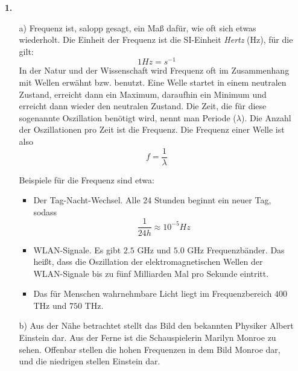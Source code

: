 \documentclass [a4paper,11pt]{article}
\author{\authorinfotitle}
\title{\titleinfo}
\date{\today}
\begin{document}
\maketitle
    \begin{enumerate}
        \item[\textbf{1.}]
            \begin{enumerate}
                \item[a)]
                Frequenz ist, salopp gesagt, ein Maß dafür, wie oft sich etwas wiederholt.
                Die Einheit der Frequenz ist die SI-Einheit \textit{Hertz} (Hz), für die gilt:
                $$1 Hz = s^{-1}$$
                In der Natur und der Wissenschaft wird Frequenz oft im Zusammenhang mit Wellen
                erwähnt bzw. benutzt. Eine Welle startet in einem neutralen Zustand,
                erreicht dann ein Maximum, daraufhin ein Minimum und erreicht dann wieder den
                neutralen Zustand. Die Zeit, die für diese sogenannte Oszillation benötigt wird,
                nennt man Periode ($\lambda$). Die Anzahl der Oszillationen pro Zeit ist die Frequenz.
                Die Frequenz einer Welle ist also $$ f = \frac{1}{\lambda} $$

                Beispiele für die Frequenz sind etwa:

                \begin{itemize}
                    \item Der Tag-Nacht-Wechsel. Alle 24 Stunden beginnt ein neuer Tag, sodass
                        $$ \frac{1}{24h} \approx 10^{-5} Hz $$
                    \item WLAN-Signale. Es gibt $2.5$ GHz und $5.0$ GHz Frequenzbänder. Das heißt,
                        dass die Oszillation der elektromagnetischen Wellen der WLAN-Signale bis zu
                        fünf Milliarden Mal pro Sekunde eintritt.
                    \item Das für Menschen wahrnehmbare Licht liegt im Frequenzbereich $400$ THz
                        und $750$ THz.
                \end{itemize}

                \item[b)]
                Aus der Nähe betrachtet stellt das Bild den bekannten Physiker Albert Einstein dar.
                Aus der Ferne ist die Schauspielerin Marilyn Monroe zu sehen.
                Offenbar stellen die hohen Frequenzen in dem Bild Monroe dar, und die
                niedrigen stellen Einstein dar.
            \end{enumerate}
    \end{enumerate}
\end{document}
